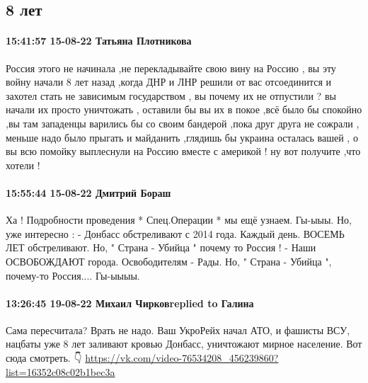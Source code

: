  
 
 
 
 

\subsection{8 лет}


\paragraph{15:41:57 15-08-22 Татьяна Плотникова}

Россия этого не начинала ,не перекладывайте свою вину на Россию , вы эту войну
начали 8 лет назад ,когда ДНР и ЛНР решили от вас отсоединится и захотел стать
не зависимым государством , вы почему их не отпустили ? вы начали их просто
уничтожать , оставили бы вы их в покое ,всё было бы спокойно ,вы там западенцы
варились бы со своим бандерой ,пока друг друга не сожрали , меньше надо было
прыгать и майданить ,глядишь бы украина осталась вашей , о вы всю помойку
выплеснули на Россию вместе с америкой ! ну вот получите ,что хотели !

\paragraph{15:55:44 15-08-22 Дмитрий Бораш}

Ха !   Подробности проведения * Спец.Операции * мы ещё узнаем.   Гы-ыыы. 
Но, уже интересно : 
- Донбасс обстреливают с 2014 года.   Каждый день.  ВОСЕМЬ ЛЕТ обстреливают.  
Но, " Страна - Убийца " почему то Россия !    
- Наши ОСВОБОЖДАЮТ города.  Освободителям - Рады.     Но, " Страна - Убийца ", почему-то Россия....       Гы-ыыыы.

\paragraph{13:26:45 19-08-22 Михаил Чирковreplied to Галина}

Сама пересчитала?
Врать не надо. Ваш УкроРейх начал АТО, и
фашисты ВСУ, нацбаты уже 8 лет заливают кровью Донбасс, уничтожают мирное население.
Вот сюда смотреть. 👇
\url{https://vk.com/video-76534208_456239860?list=16352c08c02b1bec3a}


